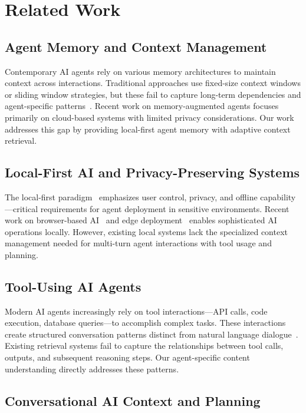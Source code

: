 \documentclass[letterpaper]{article}
\begin{document}
\section{Related Work}

\subsection{Agent Memory and Context Management}

Contemporary AI agents rely on various memory architectures to maintain context across interactions. Traditional approaches use fixed-size context windows or sliding window strategies, but these fail to capture long-term dependencies and agent-specific patterns~\citep{lewis2020retrieval}. Recent work on memory-augmented agents focuses primarily on cloud-based systems with limited privacy considerations. Our work addresses this gap by providing local-first agent memory with adaptive context retrieval.

\subsection{Local-First AI and Privacy-Preserving Systems}

The local-first paradigm~\citep{kleppmann2019local} emphasizes user control, privacy, and offline capability—critical requirements for agent deployment in sensitive environments. Recent work on browser-based AI~\citep{gokaslan2023openelm} and edge deployment~\citep{haas2017bringing} enables sophisticated AI operations locally. However, existing local systems lack the specialized context management needed for multi-turn agent interactions with tool usage and planning.

\subsection{Tool-Using AI Agents}

Modern AI agents increasingly rely on tool interactions—API calls, code execution, database queries—to accomplish complex tasks. These interactions create structured conversation patterns distinct from natural language dialogue~\citep{qu2020open}. Existing retrieval systems fail to capture the relationships between tool calls, outputs, and subsequent reasoning steps. Our agent-specific content understanding directly addresses these patterns.

\subsection{Conversational AI Context and Planning}
\end{document}

